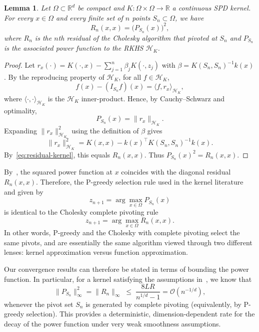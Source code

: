 \documentclass{amsart}
\newtheorem{lemma}[theorem]{Lemma}
\theoremstyle{definition}
\theoremstyle{remark}
\begin{document}
\begin{lemma}\label{lem:diag-equals-power2}
Let $\Omega\subset\mathbb{R}^d$ be compact and $K:\Omega\times \Omega \rightarrow \mathbb{R}$ a continuous SPD kernel. For every $x\in\Omega$ and every finite set of $n$ points $S_n\subset\Omega$, we have
\[
    R_n(x,x) = \big(P_{S_n}(x)\big)^2,
\]
where $R_n$ is the $n$th residual of the Cholesky algorithm that pivoted at $S_n$ and $P_{S_n}$ is the associated power function to the RKHS $\mathcal{H}_K$. 
\end{lemma}
\begin{proof}
Let $r_x(\cdot) = K(\cdot,x) - \sum_{j=1}^n \beta_j K(\cdot,z_j)$ with $\beta = K(S_n,S_n)^{-1} k(x)$.  
By the reproducing property of $\mathcal{H}_K$, for all $f\in \mathcal{H}_K$,
\[
f(x) - (I_{S_n} f)(x) = \langle f, r_x \rangle_{\mathcal{H}_K},
\]
where $\langle \cdot, \cdot \rangle_{\mathcal{H}_K}$ is the $\mathcal{H}_K$ inner-product. 
Hence, by Cauchy--Schwarz and optimality,
\[
P_{S_n}(x) = \|r_x\|_{\mathcal{H}_K}.
\]
Expanding $\|r_x\|_{\mathcal{H}_K}^2$ using the definition of $\beta$ gives
\[
\|r_x\|_{\mathcal{H}_K}^2 = K(x,x) - k(x)^\top K(S_n,S_n)^{-1} k(x).
\]
By~\cref{eq:residual-kernel}, this equals $R_n(x,x)$. Thus $P_{S_n}(x)^2 = R_n(x,x)$.
\end{proof}

By~, the squared power function at $x$ coincides with the diagonal residual $R_n(x,x)$. Therefore, the P-greedy selection rule used in the kernel literature and given by
\[
    z_{n+1} = \arg\max_{x\in \Omega} P_{S_n}(x)
\]
is identical to the Cholesky complete pivoting rule
\[
    z_{n+1} = \arg\max_{x\in \Omega} R_n(x,x).
\]
In other words, P-greedy and the Cholesky with complete pivoting select the same pivots, and are essentially the same algorithm viewed through two different lenses: kernel approximation versus function approximation. 

Our convergence results can therefore be stated in terms of bounding the power function. In particular, for a kernel satisfying the assumptions in~, we know that
\[
    \|P_{S_n}\|_\infty^2 = \|R_n\|_\infty \;\leq\; \frac{8LR}{n^{1/d}-1} = \mathcal{O}(n^{-1/d}), 
\]
whenever the pivot set $S_n$ is generated by complete pivoting (equivalently, by P-greedy selection). This provides a deterministic, dimension-dependent rate for the decay of the power function under very weak smoothness assumptions.
\end{document}
